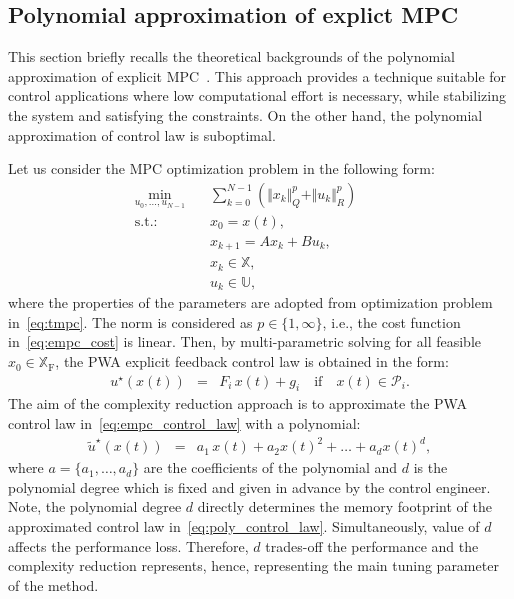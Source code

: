 \documentclass[letterpaper, 10 pt, conference]{ieeeconf}
\begin{document}
\subsection{Polynomial approximation of explict MPC}
\label{sec:polynomial}
This section briefly recalls the theoretical backgrounds of the polynomial approximation of explicit MPC~\cite{kvasnica_polynomial}. This approach provides a technique suitable for control applications where low computational effort is necessary, while stabilizing the system and satisfying the constraints. On the other hand, the polynomial approximation of control law is suboptimal. 

Let us consider the MPC optimization problem in the following form:
\begin{subequations}
	\label{eq:empc}
	\begin{eqnarray}
		\label{eq:empc_cost}
		\min_{u_{0},\ldots,u_{N-1}} \!\!\!\!\!\!\!\!\!\!\! &\,& \sum_{k=0}^{N-1} \left( \Vert x_{k} \Vert_{Q}^{p} + \Vert u_{k} \Vert_{R}^{p} \right) \qquad \\
		\label{eq:empc_rpi}
		\mathrm{s.t.\!:} &\,& x_0 = x(t), \\
		\label{eq:empc_model}
		&\,&  x_{k+1} = A x_{k} + B u_{k} , \\
		\label{eq:empc_constraints_state}
		&\,& x_{k} \in \mathbb{X} , \\
		\label{eq:empc_constraints_input}
		&\,& u_{k} \in \mathbb{U},
	\end{eqnarray}
\end{subequations}
where the properties of the parameters are adopted from optimization problem in~\eqref{eq:tmpc}. The norm is considered as $p \in \{1,\infty \}$, i.e., the cost function in~\eqref{eq:empc_cost} is linear. Then, by multi-parametric solving for all feasible $x_0 \in \mathbb{X}_{\mathrm{F}}$, the PWA explicit feedback control law is obtained in the form:
\begin{eqnarray}
	\label{eq:empc_control_law}
	u^{\star}(x(t)) \!\!\!\!&=&\!\!\!\! F_{i} \, x(t) + g_{i} \quad \text{if} \quad x(t) \in \mathcal{P}_{i}.
\end{eqnarray}
The aim of the complexity reduction approach is to approximate the PWA control law in~\eqref{eq:empc_control_law} with a polynomial:
\begin{eqnarray}
	\label{eq:poly_control_law}
	\widetilde{u}^{\star}(x(t)) \!\!\!\!&=&\!\!\!\! a_{1} \, x(t) + a_{2} x(t)^2 + \dots + a_{d} x(t)^d,
\end{eqnarray}
where $a =\{a_{1}, \dots, a_{d}\}$ are the coefficients of the polynomial and $d$ is the polynomial degree which is fixed and given in advance by the control engineer. Note, the polynomial degree $d$ directly determines the memory footprint of the approximated control law in~\eqref{eq:poly_control_law}. Simultaneously, value of $d$ affects the performance loss. Therefore, $d$ trades-off the performance and the complexity reduction represents, hence, representing the main tuning parameter of the method.
\end{document}
